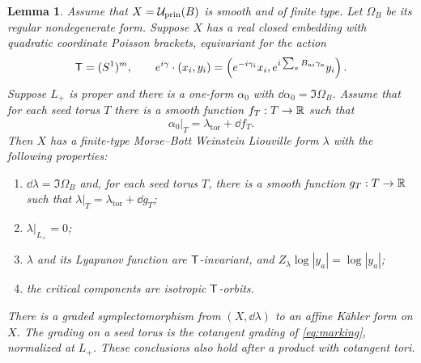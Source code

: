 \documentclass[12pt, letter]{amsart}
\newtheorem{lemma}[theorem]{Lemma}
\theoremstyle{definition}
\newcommand{\pr}{\mathrm{prin}}
\numberwithin{equation}{section}
\begin{document}
\begin{lemma}\label{lem:principal-geometry}
Assume that $X=\cU_{\pr}(B)$ is smooth and of finite type. Let  $\Omega_B$ be its regular nondegenerate form. Suppose $X$ has a real closed embedding
with quadratic coordinate Poisson brackets, equivariant for the action
\begin{equation}\label{eq:principal-compact-action}
 \mathsf T=(S^1)^m,\qquad
 e^{i\gamma}\cdot(x_i,y_i)
 =\left(e^{-i\gamma_i}x_i,
        e^{i\sum_a B_{ai}\gamma_a}y_i\right).
\end{equation}
Suppose $L_+$ is proper and there is a one-form $\alpha_0$ with
$\dd\alpha_0=\Im\Omega_B$. Assume that for each seed torus $T$
there is a smooth function $f_T:T\to\mathbb R$ such that
\[
 \alpha_0|_T=\lambda_{\mathrm{tor}}+\dd f_T.
\]
Then $X$ has a finite-type Morse--Bott Weinstein Liouville form
$\lambda$ with the following properties:
\begin{enumerate}
\item $\dd\lambda=\Im\Omega_B$ and, for each seed torus $T$,
      there is a smooth function $g_T:T\to\mathbb R$ such that
      $\lambda|_T=\lambda_{\mathrm{tor}}+\dd g_T$;
\item $\lambda|_{L_+}=0$;
\item $\lambda$ and its Lyapunov function are $\mathsf T$-invariant, and
      $Z_\lambda\log|y_a|=\log|y_a|$;
\item the critical components are isotropic $\mathsf T$-orbits.
\end{enumerate}
There is a graded symplectomorphism from $(X,\dd\lambda)$ to an
affine K\"ahler form on $X$. The grading on a seed torus is the
cotangent grading of \eqref{eq:marking}, normalized at $L_+$.
These conclusions also hold after a product with cotangent tori.
\end{lemma}
\end{document}
